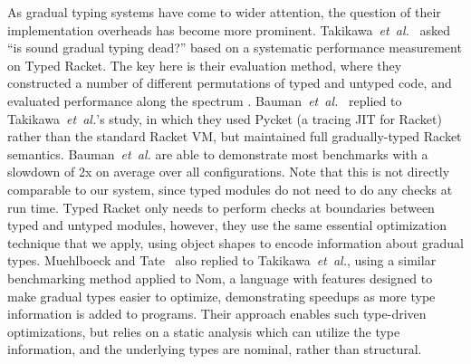 As gradual typing systems have come to wider attention, the question of their
implementation overheads has become more prominent.  
Takikawa~\textit{et~al.}~\cite{Takikawa2016} asked ``is sound gradual typing
dead?'' based on a systematic performance measurement on Typed Racket.
The key here is their evaluation method, where they constructed a
number of different permutations of typed and untyped code, and
evaluated performance along the spectrum \citep{Greenman2019jfp}.
Bauman~\textit{et~al.}~\cite{Bauman2017} replied to Takikawa~\textit{et~al.}'s study, in which they used Pycket\citep{Pycket2015} (a tracing JIT for Racket)
rather than the standard Racket VM,
but maintained full gradually-typed Racket semantics.
Bauman~\textit{et~al.} are able to demonstrate most benchmarks
with a slowdown of 2x on average over all configurations.
Note that this is not directly comparable to our system,
since typed modules do not need to do any checks at run time.
Typed Racket only needs to perform checks at boundaries between typed and untyped modules,
however, they use the same essential optimization technique that we apply,
using object shapes to encode information about gradual types.
Muehlboeck and Tate~\cite{Muehlboeck2017} also replied to
Takikawa~\textit{et~al.}, using a similar benchmarking method applied
to Nom, a language with features designed to make gradual types easier
to optimize, demonstrating speedups as more type information is added
to programs.  Their approach enables such type-driven optimizations,
but relies on a static analysis which can utilize the type
information, and the underlying types are nominal, rather than
structural.



